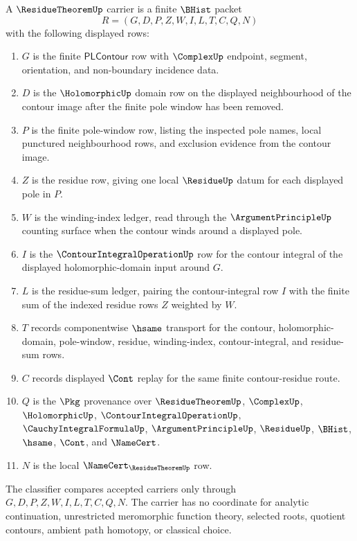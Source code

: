 \begin{definition}
\label{def:residue-theorem-carrier}
A $\ResidueTheoremUp$ carrier is a finite $\BHist$ packet
$$
R=(G,D,P,Z,W,I,L,T,C,Q,N)
$$
with the following displayed rows:
\begin{enumerate}
\item $G$ is the finite $\mathsf{PLContour}$ row with $\ComplexUp$ endpoint, segment, orientation, and non-boundary incidence data.
\item $D$ is the $\HolomorphicUp$ domain row on the displayed neighbourhood of the contour image after the finite pole window has been removed.
\item $P$ is the finite pole-window row, listing the inspected pole names, local punctured neighbourhood rows, and exclusion evidence from the contour image.
\item $Z$ is the residue row, giving one local $\ResidueUp$ datum for each displayed pole in $P$.
\item $W$ is the winding-index ledger, read through the $\ArgumentPrincipleUp$ counting surface when the contour winds around a displayed pole.
\item $I$ is the $\ContourIntegralOperationUp$ row for the contour integral of the displayed holomorphic-domain input around $G$.
\item $L$ is the residue-sum ledger, pairing the contour-integral row $I$ with the finite sum of the indexed residue rows $Z$ weighted by $W$.
\item $T$ records componentwise $\hsame$ transport for the contour, holomorphic-domain, pole-window, residue, winding-index, contour-integral, and residue-sum rows.
\item $C$ records displayed $\Cont$ replay for the same finite contour-residue route.
\item $Q$ is the $\Pkg$ provenance over $\ResidueTheoremUp$, $\ComplexUp$, $\HolomorphicUp$, $\ContourIntegralOperationUp$, $\CauchyIntegralFormulaUp$, $\ArgumentPrincipleUp$, $\ResidueUp$, $\BHist$, $\hsame$, $\Cont$, and $\NameCert$.
\item $N$ is the local $\NameCert_{\ResidueTheoremUp}$ row.
\end{enumerate}
The classifier compares accepted carriers only through $G,D,P,Z,W,I,L,T,C,Q,N$. The carrier has no coordinate for analytic continuation, unrestricted meromorphic function theory, selected roots, quotient contours, ambient path homotopy, or classical choice.
\end{definition}

